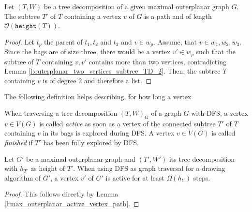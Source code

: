 \begin{lemma}
	Let $(T,W)$ be a tree decomposition of a given maximal outerplanar graph $G$. The subtree $T'$ of $T$ containing a vertex $v$ of $G$ is a path and of length $\mathcal{O}(\texttt{height}(T))$.\label{l:max_outerplanar_active_vertex_path}
\end{lemma}
\begin{proof}
	Let $t_p$ the parent of $t_1,t_2$ and $t_3$ and $v \in w_p$. Assume, that $v \in w_1,w_2,w_3$. Since the bags are of size three, there would be a vertex $v'\in w_p$ such that the subtree of $T$ containing $v,v'$ contains more than two vertices, contradicting Lemma \ref{l:outerplanar_two_vertices_subtree_TD_2}. Then, the subtree $T$ containing $v$ is of degree 2 and therefore a list.
\end{proof}
The following definition helps describing, for how long a vertex 
\begin{definition}
	When traversing a tree decomposition $(T,W)_G$ of a graph $G$ with DFS, a vertex $v\in V(G)$ is called \emph{active} as soon as a vertex of the connected subtree $T'$ of $T$ containing $v$ in its bags is explored during DFS. A vertex $v\in V(G)$ is called \emph{finished} if $T'$ has been fully explored by DFS.
\end{definition}

\begin{lemma}
	Let $G'$ be a maximal outerplanar graph and $(T',W')$ its tree decomposition with $h_{T'}$ as height of $T'$. When using DFS as graph traversal for a drawing algorithm of $G'$, a vertex $v'$ of $G'$ is active for at least $\Omega(h_{t'})$ steps.\label{l:one_vertex_active_height}
\end{lemma}
\begin{proof}
	This follows directly by Lemma \ref{l:max_outerplanar_active_vertex_path}.
\end{proof}

